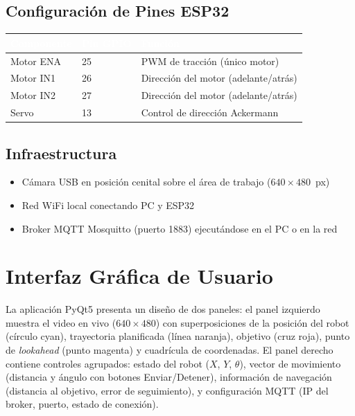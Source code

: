\documentclass[11pt,a4paper]{article}
\begin{document}
\subsection{Configuración de Pines ESP32}

\begin{table}[h!]
\centering
{}
\begin{tabular}{lll}
    \toprule
    \rowcolor{azultabla}\textcolor{white}{\textbf{Componente}} & \textcolor{white}{\textbf{Pin GPIO}} & \textcolor{white}{\textbf{Función}} \\
    \midrule
    Motor ENA & 25 & PWM de tracción (único motor) \\
    Motor IN1 & 26 & Dirección del motor (adelante/atrás) \\
    Motor IN2 & 27 & Dirección del motor (adelante/atrás) \\
    Servo     & 13 & Control de dirección Ackermann \\
    \bottomrule
\end{tabular}
\end{table}

\subsection{Infraestructura}

\begin{itemize}[nosep]
    \item Cámara USB en posición cenital sobre el área de trabajo ($640 \times 480$~px)
    \item Red WiFi local conectando PC y ESP32
    \item Broker MQTT Mosquitto (puerto 1883) ejecutándose en el PC o en la red
\end{itemize}

\section{Interfaz Gráfica de Usuario}

La aplicación PyQt5 presenta un diseño de dos paneles: el panel izquierdo muestra el video en vivo ($640 \times 480$) con superposiciones de la posición del robot (círculo cyan), trayectoria planificada (línea naranja), objetivo (cruz roja), punto de \textit{lookahead} (punto magenta) y cuadrícula de coordenadas. El panel derecho contiene controles agrupados: estado del robot ($X$, $Y$, $\theta$), vector de movimiento (distancia y ángulo con botones Enviar/Detener), información de navegación (distancia al objetivo, error de seguimiento), y configuración MQTT (IP del broker, puerto, estado de conexión).
\end{document}
